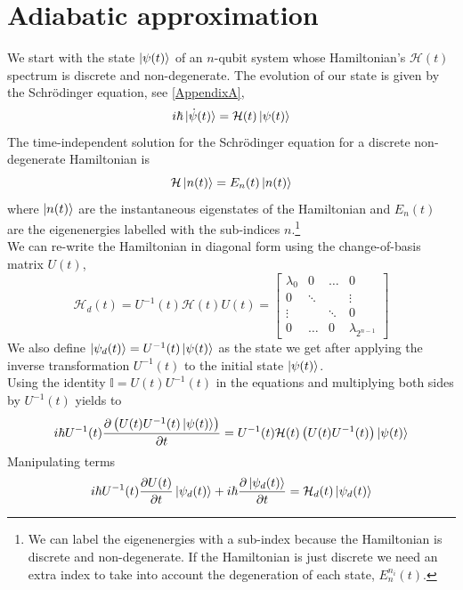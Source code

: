 \section{Adiabatic approximation}
We start with the state $\ket{\psi(t)}$ of an $n$-qubit system whose Hamiltonian's $\mathcal{H}(t)$ spectrum is discrete and non-degenerate. The evolution of our state is given by the Schrödinger equation, see \ref{AppendixA},
\begin{equation}
    i\hbar \ket{\dot{\psi}(t)} = \mathcal{H}(t) \ket{\psi(t)}
\end{equation}
The time-independent solution for the Schrödinger equation for a discrete non-degenerate Hamiltonian is
\begin{equation}
    \mathcal{H}\ket{n(t)} = E_{n}(t)\ket{n(t)}
\end{equation}
where $\ket{n(t)}$ are the instantaneous eigenstates of the Hamiltonian and $E_{n}(t)$ are the eigenenergies labelled with the sub-indices $n$.\footnote{We can label the eigenenergies with a sub-index because the Hamiltonian is discrete and non-degenerate. If the Hamiltonian is just discrete we need an extra index to take into account the degeneration of each state, $E_{n}^{n_{i}}(t)$.}\\
We can re-write the Hamiltonian in diagonal form using the change-of-basis matrix $U(t)$,
\begin{equation}
    \mathcal{H}_{d}(t) = U^{-1}(t)\mathcal{H}(t)U(t) = \begin{bmatrix}
           \lambda_{0} & 0 & \hdots & 0 \\
           0 &  \ddots & & \vdots \\
           \vdots &   & \ddots & 0 \\
           0 & \hdots & 0 & \lambda_{2^{n-1}}
         \end{bmatrix}
\end{equation}
We also define $\ket{\psi_{d}(t)} = U^{-1}(t)\ket{\psi(t)}$ as the state we get after applying the inverse transformation $U^{-1}(t)$ to the initial state $\ket{\psi(t)}$.\\
Using the identity $\mathbb{I} = U(t)U^{-1}(t)$ in the equations and multiplying both sides by $U^{-1}(t)$ yields to
\begin{equation}
     i\hbar U^{-1}(t) \frac{\partial \left(U(t)U^{-1}(t)\ket{\psi(t)}\right)}{\partial t} = U^{-1}(t)\mathcal{H}(t) \left(U(t)U^{-1}(t)\right)\ket{\psi(t)}
\end{equation}
Manipulating terms
\begin{equation}
     i\hbar U^{-1}(t) \frac{\partial U(t)}{\partial t}\ket{\psi_{d}(t)} + i\hbar  \frac{\partial \ket{\psi_{d}(t)}}{\partial t}= \mathcal{H}_{d}(t)\ket{\psi_{d}(t)}
\end{equation}
